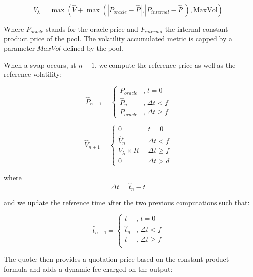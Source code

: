 \documentclass[sigconf,nonacm,prologue,table]{acmart}
\numberwithin{equation}{section}
\theoremstyle{definition}
\theoremstyle{remark}
\begin{document}
\begin{equation}
V_{\lambda} = \max\left(
    \hat{V} + \max(|P_{oracle} - \hat{P}|, |P_{internal} - \hat{P}|),
    \text{MaxVol}
\right)
\tag{5.3.1}
\end{equation}

Where $P_{oracle}$ stands for the oracle price and $P_{internal}$ the internal constant-product price of the pool. The volatility accumulated metric is capped by a parameter $MaxVol$ defined by the pool.

When a swap occurs, at $n+1$, we compute the reference price as well as the reference volatility:


\begin{equation}
\hat{P}_{n+1} = 
\begin{cases} 
P_{oracle} & \text{, } t = 0 \\
\hat{P}_n & \text{, } \Delta t < f \\
P_{oracle} & \text{, } \Delta t \geq f
\end{cases}
\tag{5.3.2}
\end{equation}

\begin{equation}
\hat{V}_{n+1} = 
\begin{cases}
0 & \text{, } t = 0\\
\hat{V}_n & \text{, } \Delta t < f \\
V_{\lambda} \times R & \text{, } \Delta t \geq f \\
0 & \text{, } \Delta t > d
\end{cases}
\tag{5.3.3}
\end{equation}

where
\begin{equation}
\Delta t = \hat{t}_{n} - t
\tag{5.3.4}
\end{equation}

and we update the reference time after the two previous computations such that:

\begin{equation}
\hat{t}_{n+1} = 
\begin{cases}
t & \text{, } t = 0\\
\hat{t}_{n} & \text{, } \Delta t < f \\
t & \text{, } \Delta t \geq f \\
\end{cases}
\tag{5.3.5}
\end{equation}

The quoter then provides a quotation price based on the constant-product formula and adds a dynamic fee charged on the output:
\end{document}
